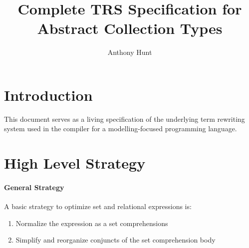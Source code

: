 \documentclass{article}
\title{Complete TRS Specification for Abstract Collection Types}
\author{Anthony Hunt}
\begin{document}
\maketitle
\tableofcontents
\newpage

\section{Introduction}
This document serves as a living specification of the underlying term rewriting system used in the compiler for a modelling-focused programming language.

\section{High Level Strategy}

\paragraph{General Strategy}
A basic strategy to optimize set and relational expressions is:
\begin{enumerate}
  \item Normalize the expression as a set comprehensions
  \item Simplify and reorganize conjuncts of the set comprehension body
\end{enumerate}
\end{document}
